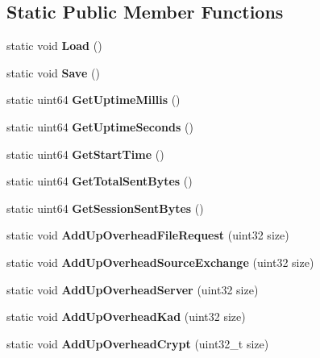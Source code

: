 \subsection*{Static Public Member Functions}
\begin{DoxyCompactItemize}
\item 
static void {\bfseries Load} ()\label{classCStatistics_a3cf7f2cb29b7a43216d660c40e7cce0c}

\item 
static void {\bfseries Save} ()\label{classCStatistics_ac331cfac11c0465a3cdb9740ee65ab7f}

\item 
static uint64 {\bfseries GetUptimeMillis} ()\label{classCStatistics_a073fd36550a8befb6c177dfc71bc899f}

\item 
static uint64 {\bfseries GetUptimeSeconds} ()\label{classCStatistics_a9d4b18928b0a97b01dc6872e9e7fd9c3}

\item 
static uint64 {\bfseries GetStartTime} ()\label{classCStatistics_ad945d3d91f3677c83dc4950a70c03a20}

\item 
static uint64 {\bfseries GetTotalSentBytes} ()\label{classCStatistics_a6e61f5a7f412385b7385cd3346930a5e}

\item 
static uint64 {\bfseries GetSessionSentBytes} ()\label{classCStatistics_a17689dc0e88f4dc7eeb0a20021b72cda}

\item 
static void {\bfseries AddUpOverheadFileRequest} (uint32 size)\label{classCStatistics_a3d5450f3df080b584a25f11ea183dd18}

\item 
static void {\bfseries AddUpOverheadSourceExchange} (uint32 size)\label{classCStatistics_ac1e57f8558dcc421e793576b96cbd0ce}

\item 
static void {\bfseries AddUpOverheadServer} (uint32 size)\label{classCStatistics_a4874b8e69b3399aee09281ac19485d39}

\item 
static void {\bfseries AddUpOverheadKad} (uint32 size)\label{classCStatistics_aca916b382ca3db73f9378542642e53c2}

\item 
static void {\bfseries AddUpOverheadCrypt} (uint32\_\-t size)\label{classCStatistics_af9093d6ef8b615c7b2691e6419a07c9a}


\end{DoxyCompactItemize}
